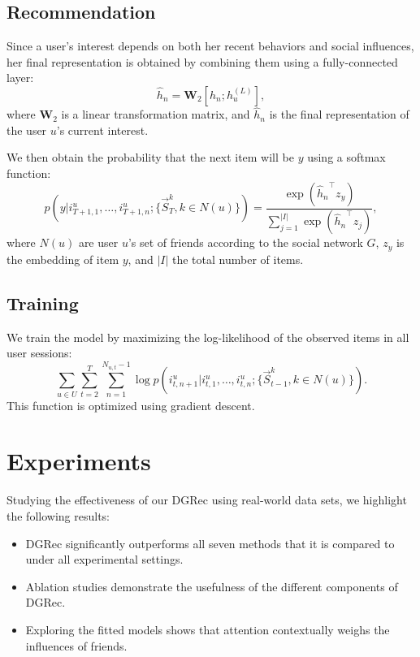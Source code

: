 \documentclass[sigconf]{acmart}
\begin{document}
\subsection{Recommendation}\label{sec:recommendation}
Since a user's interest depends on both her recent behaviors and social influences, her final representation is obtained by combining them using a fully-connected layer:
\begin{equation}\label{eqt:attnlayer}
\hat{h}_n = \textbf{W}_2[h_n; h_u^{(L)}],
\end{equation}
where $\textbf{W}_2$ is a linear transformation matrix, and $\hat{h}_n$ is the final representation of the user $u$'s current interest. 

We then obtain the probability that the next item will be $y$ using a softmax function:
\begin{equation}\label{eqt:softmax2}
p(y | i_{T+1,1}^{u},\ldots, i_{T+1,n}^{u}; \{\vec{S}_{T}^k, k\in{N(u)}\}) = \frac{\exp({\hat{h}_n}^\top z_y)}{\sum_{j=1}^{|I|}\exp({\hat{h}_n}^\top z_j)}, 
\end{equation}
where $N(u)$ are user $u$'s set of friends according to the social network $G$, $z_y$ is the embedding of item $y$, and $|I|$ the total number of items.

\subsection{Training}
We train the model by maximizing the log-likelihood of the observed items in all user sessions:
\begin{equation}
\label{eqn::obj}
   \sum_{u\in U} \sum_{t=2}^{T} \sum_{n=1}^{N_{u, t}-1} \log p(i_{t,n+1}^{u}|i_{t,1}^{u},\ldots, i_{t,n}^{u}; \{\vec{S}_{t-1}^k, k\in{N(u)}\}).
\end{equation}
This function is optimized using gradient descent.  \section{Experiments}
Studying the effectiveness of our \gls{DGRec} using real-world data sets, we highlight the following results: 
\begin{itemize}
\item \gls{DGRec} significantly outperforms all seven methods that it is compared to under all experimental settings.
\item Ablation studies demonstrate the usefulness of the different components of \gls{DGRec}.
\item Exploring the fitted models shows that attention contextually weighs the influences of friends.
\end{itemize}
\end{document}
